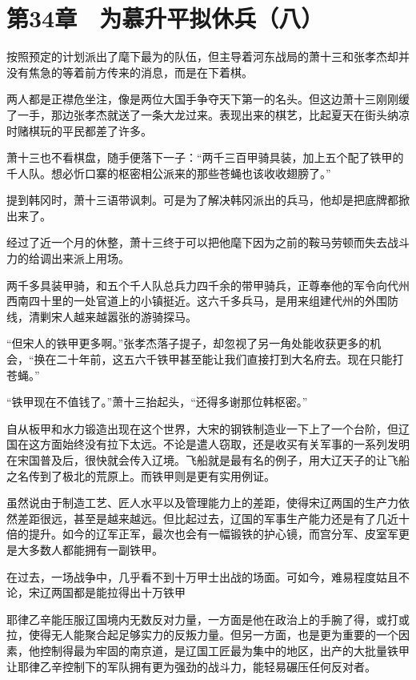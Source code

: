 \section{第34章　为慕升平拟休兵（八）}

按照预定的计划派出了麾下最为的队伍，但主导着河东战局的萧十三和张孝杰却并没有焦急的等着前方传来的消息，而是在下着棋。

两人都是正襟危坐注，像是两位大国手争夺天下第一的名头。但这边萧十三刚刚缓了一手，那边张孝杰就送了一条大龙过来。表现出来的棋艺，比起夏天在街头纳凉时赌棋玩的平民都差了许多。

萧十三也不看棋盘，随手便落下一子：“两千三百甲骑具装，加上五个配了铁甲的千人队。想必忻口寨的枢密相公派来的那些苍蝇也该收收翅膀了。”

提到韩冈时，萧十三语带讽刺。可是为了解决韩冈派出的兵马，他却是把底牌都掀出来了。

经过了近一个月的休整，萧十三终于可以把他麾下因为之前的鞍马劳顿而失去战斗力的给调出来派上用场。

两千多具装甲骑，和五个千人队总兵力四千余的带甲骑兵，正尊奉他的军令向代州西南四十里的一处官道上的小镇挺近。这六千多兵马，是用来组建代州的外围防线，清剿宋人越来越嚣张的游骑探马。

“但宋人的铁甲更多啊。”张孝杰落子提子，却忽视了另一角处能收获更多的机会，“换在二十年前，这五六千铁甲甚至能让我们直接打到大名府去。现在只能打苍蝇。”

“铁甲现在不值钱了。”萧十三抬起头，“还得多谢那位韩枢密。”

自从板甲和水力锻造出现在这个世界，大宋的钢铁制造业一下上了一个台阶，但辽国在这方面始终没有拉下太远。不论是遣人窃取，还是收买有关军事的一系列发明在宋国普及后，很快就会传入辽境。飞船就是最有名的例子，用大辽天子的让飞船之名传到了极北的荒原上。而铁甲则是更有实用例证。

虽然说由于制造工艺、匠人水平以及管理能力上的差距，使得宋辽两国的生产力依然差距很远，甚至是越来越远。但比起过去，辽国的军事生产能力还是有了几近十倍的提升。如今的辽军正军，最次也会有一幅锻铁的护心镜，而宫分军、皮室军更是大多数人都能拥有一副铁甲。

在过去，一场战争中，几乎看不到十万甲士出战的场面。可如今，难易程度姑且不论，宋辽两国都是能拉得出十万铁甲

耶律乙辛能压服辽国境内无数反对力量，一方面是他在政治上的手腕了得，或打或拉，使得无人能聚合起足够实力的反叛力量。但另一方面，也是更为重要的一个因素，他控制得最为牢固的南京道，是辽国工匠最为集中的地区，出产的大批量铁甲让耶律乙辛控制下的军队拥有更为强劲的战斗力，能轻易碾压任何反对者。

